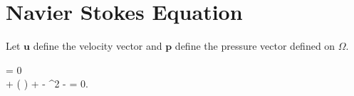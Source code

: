 \section{Navier Stokes Equation}

Let $\bm{u}$ define the velocity vector and $\bm{p}$ define the pressure vector defined on $\Omega$.

\be
\bc
\nabla \cdot {} = 0 \\
\dis {} + ( \cdot \nabla {})  +  \nabla {} - \nu \nabla^2  -  = 0.
\ec
\label{navier_stokes}
\ee

